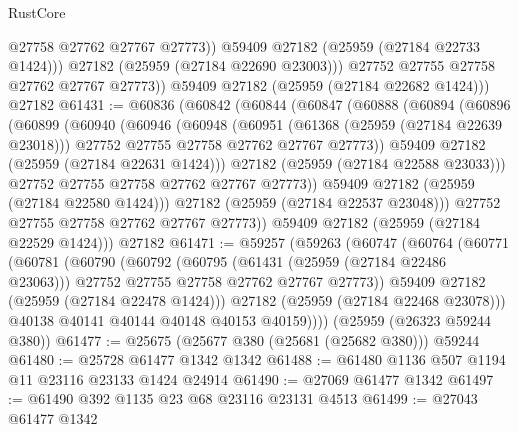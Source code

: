 \begin{lexlean}{RustCore}
\begin{coremodule}
                  @27758
                  @27762
                  @27767
                  @27773))
              @59409
              @27182
              (@25959 (@27184 @22733 @1424)))
            @27182
            (@25959 (@27184 @22690 @23003)))
          @27752
          @27755
          @27758
          @27762
          @27767
          @27773))
      @59409
      @27182
      (@25959 (@27184 @22682 @1424)))
    @27182
@61431 := @60836
    (@60842
      (@60844
        (@60847
          (@60888
            (@60894
              (@60896
                (@60899
                  (@60940
                    (@60946
                      (@60948
                        (@60951
                          (@61368 (@25959 (@27184 @22639 @23018)))
                          @27752
                          @27755
                          @27758
                          @27762
                          @27767
                          @27773))
                      @59409
                      @27182
                      (@25959 (@27184 @22631 @1424)))
                    @27182
                    (@25959 (@27184 @22588 @23033)))
                  @27752
                  @27755
                  @27758
                  @27762
                  @27767
                  @27773))
              @59409
              @27182
              (@25959 (@27184 @22580 @1424)))
            @27182
            (@25959 (@27184 @22537 @23048)))
          @27752
          @27755
          @27758
          @27762
          @27767
          @27773))
      @59409
      @27182
      (@25959 (@27184 @22529 @1424)))
    @27182
@61471 := @59257
    (@59263
      (@60747
        (@60764
          (@60771
            (@60781
              (@60790
                (@60792
                  (@60795
                    (@61431 (@25959 (@27184 @22486 @23063)))
                    @27752
                    @27755
                    @27758
                    @27762
                    @27767
                    @27773))
                @59409
                @27182
                (@25959 (@27184 @22478 @1424)))
              @27182
              (@25959 (@27184 @22468 @23078)))
            @40138
            @40141
            @40144
            @40148
            @40153
            @40159))))
    (@25959 (@26323 @59244 @380))
@61477 := @25675 (@25677 @380 (@25681 (@25682 @380))) @59244
@61480 := @25728 @61477 @1342 @1342
@61488 := @61480 @1136 @507 @1194 @11 @23116 @23133 @1424 @24914
@61490 := @27069 @61477 @1342
@61497 := @61490 @392 @1135 @23 @68 @23116 @23131 @4513
@61499 := @27043 @61477 @1342

\end{coremodule}
\end{lexlean}
